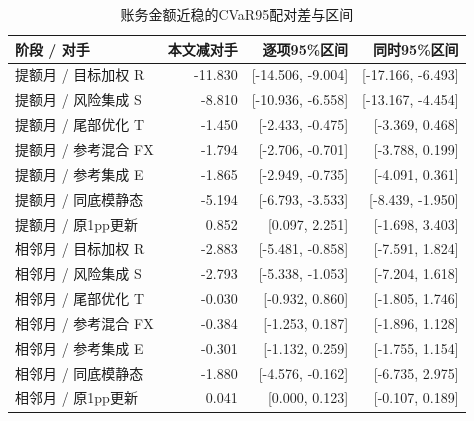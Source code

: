 \begin{table}[H]\centering\caption{账务金额近稳的CVaR95配对差与区间}
\fontsize{9bp}{12bp}\selectfont
\begin{tabularx}{\linewidth}{@{}Yrrr@{}}\toprule
阶段 / 对手 & 本文减对手 & 逐项95\%区间 & 同时95\%区间\\\midrule
提额月 / 目标加权 R & -11.830 & [-14.506, -9.004] & [-17.166, -6.493]\\
提额月 / 风险集成 S & -8.810 & [-10.936, -6.558] & [-13.167, -4.454]\\
提额月 / 尾部优化 T & -1.450 & [-2.433, -0.475] & [-3.369, 0.468]\\
提额月 / 参考混合 FX & -1.794 & [-2.706, -0.701] & [-3.788, 0.199]\\
提额月 / 参考集成 E & -1.865 & [-2.949, -0.735] & [-4.091, 0.361]\\
提额月 / 同底模静态 & -5.194 & [-6.793, -3.533] & [-8.439, -1.950]\\
提额月 / 原1pp更新 & 0.852 & [0.097, 2.251] & [-1.698, 3.403]\\
相邻月 / 目标加权 R & -2.883 & [-5.481, -0.858] & [-7.591, 1.824]\\
相邻月 / 风险集成 S & -2.793 & [-5.338, -1.053] & [-7.204, 1.618]\\
相邻月 / 尾部优化 T & -0.030 & [-0.932, 0.860] & [-1.805, 1.746]\\
相邻月 / 参考混合 FX & -0.384 & [-1.253, 0.187] & [-1.896, 1.128]\\
相邻月 / 参考集成 E & -0.301 & [-1.132, 0.259] & [-1.755, 1.154]\\
相邻月 / 同底模静态 & -1.880 & [-4.576, -0.162] & [-6.735, 2.975]\\
相邻月 / 原1pp更新 & 0.041 & [0.000, 0.123] & [-0.107, 0.189]\\
\bottomrule\end{tabularx}
\end{table}